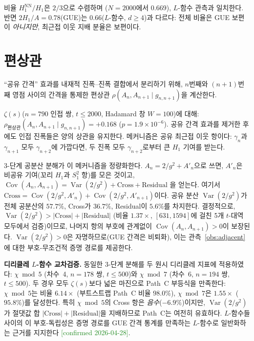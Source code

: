 \documentclass[11pt,a4paper]{article}
\theoremstyle{plain}
\theoremstyle{definition}
\begin{document}
비율 $H_1^{\mathrm{NN}}/H_1$은 $2/3$으로 수렴하며
($N = 2000$에서 $0.669$), $L$-함수 관측과 일치한다.
반면 $2H_1/A = 0.78$(GUE)는 $0.66$($L$-함수, $d \ge 4$)과 다르다:
전체 비율은 GUE 보편이 \emph{아니지만}, 최근접 이웃 지배 분율은 보편이다.


\section{편상관}
\label{sec:partial}

``공유 간격'' 효과를 내재적 진폭--진폭 결합에서 분리하기 위해,
$n$번째와 $(n\!+\!1)$번째 영점 사이의 간격을 통제한
편상관 $\rho(A_n, A_{n+1} \mid g_{n,n+1})$을 계산한다.

$\zeta(s)$($n = 790$ 인접 쌍, $t \le 2000$, Hadamard 창 $W\!=\!100$)에 대해:
$\rho_{\mathrm{편상관}}(A_n, A_{n+1} \mid g_{n,n+1}) = +0.168$
($p = 1.9 \times 10^{-6}$).
공유 간격 효과를 제거한 후에도 인접 진폭들은 양의 상관을 유지한다.
메커니즘은 공유 최근접 이웃 항이다: $\gamma_n$과 $\gamma_{n+1}$ 모두
$\gamma_{n+2}$에 가깝다면, 두 진폭 모두 $\gamma_{n+2}$로부터 큰
$H_1$ 기여를 받는다.

3-단계 공분산 분해가 이 메커니즘을 정량화한다.
$A_n = 2/g^2 + A'_n$으로 쓰면, $A'_n$은 비공유 기여(꼬리 $H_1$과
$S_1^2$ 항)를 모은 것이고,
$\operatorname{Cov}(A_n, A_{n+1})
  = \operatorname{Var}(2/g^2) + \text{Cross} + \text{Residual}$
을 얻는다. 여기서 $\text{Cross} = \operatorname{Cov}(2/g^2, A'_n)
  + \operatorname{Cov}(2/g^2, A'_{n+1})$이다.
공유 분산 $\operatorname{Var}(2/g^2)$가 전체 공분산의 $57.7\%$,
Cross가 $36.7\%$, Residual이 $5.6\%$를 차지한다.
결정적으로,
$\operatorname{Var}(2/g^2) > |\text{Cross}| + |\text{Residual}|$
(비율 $1.37\times$, $[631, 1594]$에 걸친 5개 $t$-대역 모두에서 검증)이므로,
나머지 항의 부호에 관계없이 $\operatorname{Cov}(A_n, A_{n+1}) > 0$이
보장된다.
$\operatorname{Var}(2/g^2) > 0$은 자명하므로(GUE 간격은 비퇴화),
이는 관측~\ref{obs:adjacent}에 대한 부호-무조건적 증명 경로를 제공한다.

\textbf{디리클레 $L$-함수 교차검증.}
동일한 3-단계 분해를 두 원시 디리클레 지표에 적용하였다:
$\chi \bmod 5$ (차수~4, $n = 178$ 쌍, $t \le 500$)와
$\chi \bmod 7$ (차수~6, $n = 194$ 쌍, $t \le 500$).
두 경우 모두 $\zeta(s)$보다 넓은 마진으로 Path~C 부등식을 만족한다:
$\chi \bmod 5$는 비율 $6.14\times$ (부트스트랩 Path~C 비율 $98.0\%$),
$\chi \bmod 7$은 $1.55\times$ ($95.8\%$)를 달성한다.
특히 $\chi \bmod 5$의 Cross 항은 \emph{음수}($-6.9\%$)이지만,
$\operatorname{Var}(2/g^2)$가 절댓값 합
$|\text{Cross}| + |\text{Residual}|$을 지배하므로
Path~C는 여전히 유효하다.
$L$-함수들 사이의 이 부호-독립성은 증명 경로를
GUE 간격 통계를 만족하는 $L$-함수로 일반화하는 근거를 지지한다
\textcolor{ForestGreen}{[confirmed 2026-04-28]}.
\end{document}
